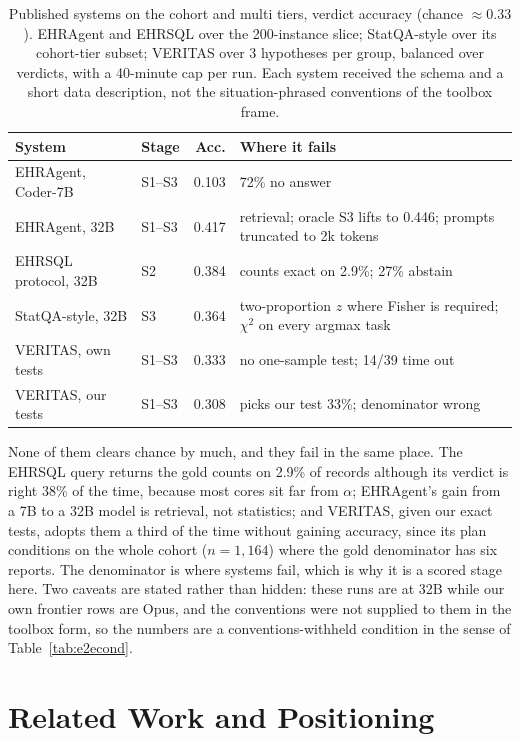 \begin{table}[t]
\centering
\small
\begin{tabularx}{\textwidth}{@{}l l r Y@{}}
\toprule
System & Stage & Acc. & Where it fails \\
\midrule
EHRAgent, Coder-7B & S1--S3 & 0.103 & 72\% no answer \\
EHRAgent, 32B & S1--S3 & 0.417 & retrieval; oracle S3 lifts to 0.446; prompts truncated to 2k tokens \\
EHRSQL protocol, 32B & S2 & 0.384 & counts exact on 2.9\%; 27\% abstain \\
StatQA-style, 32B & S3 & 0.364 & two-proportion $z$ where Fisher is required; $\chi^2$ on every argmax task \\
VERITAS, own tests & S1--S3 & 0.333 & no one-sample test; 14/39 time out \\
VERITAS, our tests & S1--S3 & 0.308 & picks our test 33\%; denominator wrong \\
\bottomrule
\end{tabularx}
\caption{Published systems on the cohort and multi tiers, verdict accuracy
(chance $\approx 0.33$). EHRAgent and EHRSQL over the 200-instance slice;
StatQA-style over its cohort-tier subset; VERITAS over 3 hypotheses per group,
balanced over verdicts, with a 40-minute cap per run. Each system received the
schema and a short data description, not the situation-phrased conventions of
the toolbox frame.}
\label{tab:external}
\end{table}

None of them clears chance by much, and they fail in the same place. The
EHRSQL query returns the gold counts on 2.9\% of records although its verdict
is right 38\% of the time, because most cores sit far from $\alpha$; EHRAgent's
gain from a 7B to a 32B model is retrieval, not statistics; and VERITAS, given
our exact tests, adopts them a third of the time without gaining accuracy,
since its plan conditions on the whole cohort ($n = 1{,}164$) where the gold
denominator has six reports. The denominator is where systems fail, which is
why it is a scored stage here. Two caveats are stated rather than hidden: these
runs are at 32B while our own frontier rows are Opus, and the conventions were
not supplied to them in the toolbox form, so the numbers are a
conventions-withheld condition in the sense of Table~\ref{tab:e2econd}.

\section{Related Work and Positioning}
\label{sec:related}

